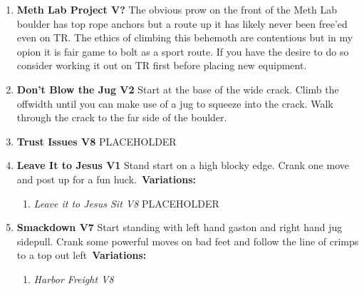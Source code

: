 \label{pt:Octurnal}
\label{pt:Smackdown}
\begin{enumerate}[]
	\item\label{rt:Meth Lab Project} \colorbox{black!20}{\textbf{Meth Lab Project V?  \warn \warn \warn } }
	\newline The obvious prow on the front of the Meth Lab boulder has top rope anchors but a route up it has likely never been free'ed even on TR. The ethics of climbing this behemoth are contentious but in my opion it is fair game to bolt as a sport route. If you have the desire to do so consider working it out on TR first before placing new equipment.\
	\item\label{rt:Don't Blow the Jug} \colorbox{green!20}{\textbf{Don't Blow the Jug V2  } }
	\newline Start at the base of the wide crack. Climb the offwidth until you can make use of a jug to squeeze into the crack. Walk through the crack to the far side of the boulder.\
	\item\label{rt:Trust Issues} \colorbox{Goldenrod!50}{\textbf{Trust Issues V8  \warn \warn } }
	\newline PLACEHOLDER\
	\item\label{rt:Leave It to Jesus} \colorbox{green!20}{\textbf{Leave It to Jesus V1 \ding{72} \ding{72} \ding{72}  } }
	\newline Stand start on a high blocky edge. Crank one move and post up for a fun huck.\
	\newline \textbf{Variations:}
	\begin{enumerate}
		\item\label{vr:Leave it to Jesus Sit} \colorbox{Goldenrod!50}{\emph{Leave it to Jesus Sit V8  }  }
		\newline PLACEHOLDER\
	\end{enumerate}
	\item\label{rt:Smackdown} \colorbox{Goldenrod!50}{\textbf{Smackdown V7      } }
	\newline Start standing with left hand gaston and right hand jug sidepull. Crank some powerful moves on bad feet and follow the line of crimps to a top out left\
	\newline \textbf{Variations:}
	\begin{enumerate}
		\item\label{vr:Harbor Freight} \colorbox{Goldenrod!50}{\emph{Harbor Freight V8  }  }

\end{enumerate}
\end{enumerate}
